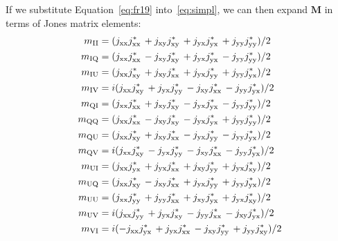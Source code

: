 \noindent  If we substitute Equation~\ref{eq:fr19} into~\ref{eq:simpl}, we can then expand $\bm{M}$ in terms of Jones matrix elements:
%
\begin{subequations}\label{eq:fr20}
  \begin{align}
  m_{\rm II} & = (j_{\rm xx}j_{\rm xx}^{*}\, + j_{\rm xy}j_{\rm xy}^{*}\, + j_{\rm yx}j_{\rm yx}^{*}\, + j_{\rm yy}j_{\rm yy}^{*})/2  	\label{eq:fr20a}\\
  m_{\rm IQ} & = (j_{\rm xx}j_{\rm xx}^{*}\, - j_{\rm xy}j_{\rm xy}^{*}\, + j_{\rm yx}j_{\rm yx}^{*}\, - j_{\rm yy}j_{\rm yy}^{*})/2 	 \label{eq:fr20b}\\
  m_{\rm IU} & = (j_{\rm xx}j_{\rm xy}^{*}\, + j_{\rm xy}j_{\rm xx}^{*}\, + j_{\rm yx}j_{\rm yy}^{*}\, + j_{\rm yy}j_{\rm yx}^{*})/2  	\label{eq:fr20c}\\
  m_{\rm IV} & = i(j_{\rm xx}j_{\rm xy}^{*}\, + j_{\rm yx}j_{\rm yy}^{*}\, - j_{\rm xy}j_{\rm xx}^{*}\, - j_{\rm yy}j_{\rm yx}^{*})/2  	\label{eq:fr20d}\\
  m_{\rm QI} & = (j_{\rm xx}j_{\rm xx}^{*}\, + j_{\rm xy}j_{\rm xy}^{*}\, - j_{\rm yx}j_{\rm yx}^{*}\, - j_{\rm yy}j_{\rm yy}^{*})/2  	\label{eq:fr20e}\\
  m_{\rm QQ} & = (j_{\rm xx}j_{\rm xx}^{*}\, - j_{\rm xy}j_{\rm xy}^{*}\, - j_{\rm yx}j_{\rm yx}^{*}\, + j_{\rm yy}j_{\rm yy}^{*})/2  	\label{eq:fr20f}\\
  m_{\rm QU} & = (j_{\rm xx}j_{\rm xy}^{*}\, + j_{\rm xy}j_{\rm xx}^{*}\, - j_{\rm yx}j_{\rm yy}^{*}\, - j_{\rm yy}j_{\rm yx}^{*})/2 	\label{eq:fr20g}\\
  m_{\rm QV} & = i(j_{\rm xx}j_{\rm xy}^{*}\, - j_{\rm yx}j_{\rm yy}^{*}\, - j_{\rm xy}j_{\rm xx}^{*}\, - j_{\rm yy}j_{\rm yx}^{*})/2 	\label{eq:fr20h}\\
  m_{\rm UI} & = (j_{\rm xx}j_{\rm yx}^{*}\, + j_{\rm yx}j_{\rm xx}^{*}\, + j_{\rm xy}j_{\rm yy}^{*}\, + j_{\rm yx}j_{\rm xy}^{*})/2 	\label{eq:fr20i}\\
  m_{\rm UQ} & = (j_{\rm xx}j_{\rm xy}^{*}\, - j_{\rm xy}j_{\rm xx}^{*}\, + j_{\rm yx}j_{\rm yy}^{*}\, + j_{\rm yy}j_{\rm yx}^{*})/2  	\label{eq:fr20j}\\
  m_{\rm UU} & = (j_{\rm xx}j_{\rm yy}^{*}\, + j_{\rm yy}j_{\rm xx}^{*}\, + j_{\rm xy}j_{\rm yx}^{*}\, + j_{\rm yx}j_{\rm xy}^{*})/2 	 \label{eq:fr20k}\\
  m_{\rm UV} & = i(j_{\rm xx}j_{\rm yy}^{*}\, + j_{\rm yx}j_{\rm xy}^{*}\, - j_{\rm yy}j_{\rm xx}^{*}\, - j_{\rm xy}j_{\rm yx}^{*})/2 	\label{eq:fr20l}\\
  m_{\rm VI} & = i(-j_{\rm xx}j_{\rm yx}^{*}\, + j_{\rm yx}j_{\rm xx}^{*}\, - j_{\rm xy}j_{\rm yy}^{*}\, + j_{\rm yy}j_{\rm xy}^{*})/2  	\label{eq:fr20m}\\

\end{align}
\end{subequations}
